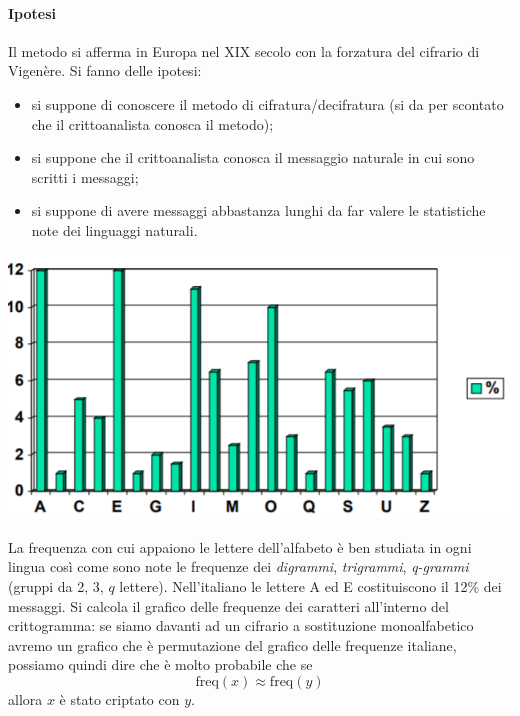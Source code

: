 \paragraph{Ipotesi} Il metodo si afferma in Europa nel XIX secolo con la forzatura del cifrario di Vigenère. Si fanno delle ipotesi:
\begin{itemize}
    \item si suppone di conoscere il metodo di cifratura/decifratura (si da per scontato che il crittoanalista conosca il metodo);
    \item si suppone che il crittoanalista conosca il messaggio naturale in cui sono scritti i messaggi;
    \item si suppone di avere messaggi abbastanza lunghi da far valere le statistiche note dei linguaggi naturali.
\end{itemize}
\begin{center}
	\includegraphics[scale=.56]{images/13.PNG}
\end{center}
La frequenza con cui appaiono le lettere dell'alfabeto è ben studiata in ogni lingua così come sono note le frequenze dei \emph{digrammi}, \emph{trigrammi}, \emph{q-grammi} (gruppi da 2, 3, $q$ lettere). Nell'italiano le lettere A ed E costituiscono il 12\% dei messaggi. Si calcola il grafico delle frequenze dei caratteri all'interno del crittogramma: se siamo davanti ad un cifrario a sostituzione monoalfabetico avremo un grafico che è permutazione del grafico delle frequenze italiane, possiamo quindi dire che è molto probabile che se $$\text{freq}\left(x\right) \approx \text{freq}\left(y\right)$$ allora $x$ è stato criptato con $y$.
